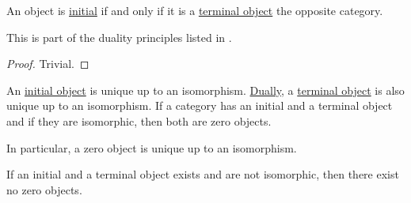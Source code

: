 \begin{proposition}\label{thm:universal_object_duality}
  An object is \hyperref[def:universal_objects/initial]{initial} if and only if it is a \hyperref[def:universal_objects/terminal]{terminal object} the opposite category.

  This is part of the duality principles listed in .
\end{proposition}
\begin{proof}
  Trivial.
\end{proof}

\begin{proposition}\label{thm:def:universal_objects}
  \hfill
  \begin{thmenum}
     An \hyperref[def:universal_objects/initial]{initial object} is unique up to an isomorphism.
     \hyperref[thm:categorical_principle_of_duality]{Dually}, a \hyperref[def:universal_objects/initial]{terminal object} is also unique up to an isomorphism.
     If a category has an initial and a terminal object and if they are isomorphic, then both are zero objects.

    In particular, a zero object is unique up to an isomorphism.

     If an initial and a terminal object exists and are not isomorphic, then there exist no zero objects.
  \end{thmenum}
\end{proposition}
